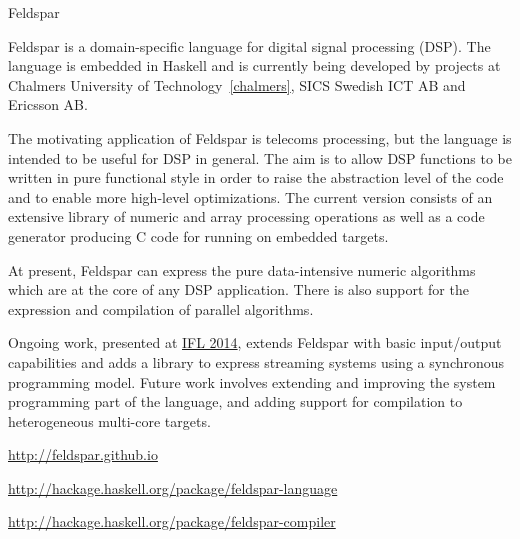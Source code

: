 \begin{hcarentry}[updated]{Feldspar}
\label{feldspar}
\makeheader

Feldspar is a domain-specific language for digital signal processing (DSP). The
language is embedded in Haskell and is currently being developed by projects at
Chalmers University of Technology~\cref{chalmers}, SICS Swedish ICT AB and
Ericsson AB.

The motivating application of Feldspar is telecoms processing, but the language
is intended to be useful for DSP in general. The aim is to allow DSP functions
to be written in pure functional style in order to raise the abstraction level of
the code and to enable more high-level optimizations. The current version consists
of an extensive library of numeric and array processing operations as well as a
code generator producing C code for running on embedded targets.

At present, Feldspar can express the pure data-intensive numeric algorithms
which are at the core of any DSP application. There is also support for the
expression and compilation of parallel algorithms.

Ongoing work, presented at \href{http://ifl2014.github.io/submissions/ifl2014_submission_23.pdf}{IFL 2014},
extends Feldspar with basic input/output capabilities and adds a library to
express streaming systems using a synchronous programming model. Future work
involves extending and improving the system programming part of the language, and
adding support for compilation to heterogeneous multi-core targets.

\FurtherReading
\begin{compactitem}
\item \url{http://feldspar.github.io}
\item \url{http://hackage.haskell.org/package/feldspar-language}
\item \url{http://hackage.haskell.org/package/feldspar-compiler}
\end{compactitem}
\end{hcarentry}
